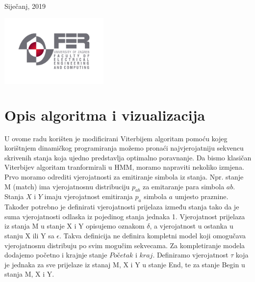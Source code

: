 \documentclass[a4paper]{article}
\begin{document}
\begin{titlepage}
	
	
	\vfill\vfill\vfill %
	
	{\large Siječanj, 2019} %
	
	
	\vfill\vfill
	\includegraphics[width=0.4\textwidth]{fer_logo.jpg}\\[1cm] %
	 
	
	\vfill %
	
\end{titlepage}






\section{Opis algoritma i vizualizacija}
U ovome radu korišten je modificirani Viterbijem algoritam pomoću kojeg korištnjem dinamičkog programiranja možemo pronaći najvjerojatniju sekvencu skrivenih stanja koja ujedno predstavlja optimalno poravnanje.
Da bismo klasičan Viterbijev algoritam tranformirali u HMM, moramo napraviti nekoliko izmjena. Prvo moramo odrediti vjerojatnosti za emitiranje simbola iz stanja. Npr. stanje M (match) ima vjerojatnosnu distribuciju $p_{ab}$ za emitaranje para simbola $ab$. Stanja $X$ i $Y$ imaju vjerojatnost emitiranja $p_a$ simbola $a$ umjesto praznine.
Također potrebno je definirati vjerojatnosti prijelaza između stanja tako da je suma vjerojatnosti odlaska iz pojedinog stanja jednaka 1. Vjerojatnost prijelaza iz stanja M u stanje X i Y opisujemo oznakom $\delta$, a vjerojatnost u ostanka u stanju X ili Y sa $\epsilon$.
Takva definicija ne definira kompletni model koji omogučava vjerojatnosnu distribuju po svim mogučim sekvecama. Za kompletiranje modela dodajemo početno i krajnje stanje $Početak$ i $kraj$. Definiramo vjerojatnost $\tau$ koja je jednaka za sve prijelaze iz stanaj M, X i Y u stanje End, te za stanje Begin u stanja M, X i Y.
\end{document}
